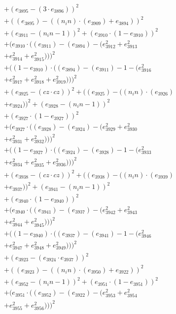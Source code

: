 \documentclass[10pt, a4paper]{article}
\begin{document}
\begin{align*}
& + (e_{3895} - (3  \cdot  e_{3896}))^{2} \\
& + ((e_{3895}) - ((n_in)  \cdot  (e_{3909}) + e_{3894}))^{2} \\
& + (e_{3911} - (n_in - 1))^{2} + (e_{3910}  \cdot  (1 - e_{3910}))^{2} \\
& + (e_{3910}  \cdot  ((e_{3911}) - (e_{3894}) - (e_{3912}^{2} + e_{3913}^{2} \\
& + e_{3914}^{2} + e_{3915}^{2})))^{2} \\
& + ((1 - e_{3910})  \cdot  ((e_{3894}) - (e_{3911}) - 1 - (e_{3916}^{2} \\
& + e_{3917}^{2} + e_{3918}^{2} + e_{3919}^{2})))^{2} \\
& + (e_{3925} - (cz  \cdot  cz))^{2} + ((e_{3925}) - ((n_in)  \cdot  (e_{3926}) \\
& + e_{3924}))^{2} + (e_{3928} - (n_in - 1))^{2} \\
& + (e_{3927}  \cdot  (1 - e_{3927}))^{2} \\
& + (e_{3927}  \cdot  ((e_{3928}) - (e_{3924}) - (e_{3929}^{2} + e_{3930}^{2} \\
& + e_{3931}^{2} + e_{3932}^{2})))^{2} \\
& + ((1 - e_{3927})  \cdot  ((e_{3924}) - (e_{3928}) - 1 - (e_{3933}^{2} \\
& + e_{3934}^{2} + e_{3935}^{2} + e_{3936}^{2})))^{2} \\
& + (e_{3938} - (cz  \cdot  cz))^{2} + ((e_{3938}) - ((n_in)  \cdot  (e_{3939}) \\
& + e_{3937}))^{2} + (e_{3941} - (n_in - 1))^{2} \\
& + (e_{3940}  \cdot  (1 - e_{3940}))^{2} \\
& + (e_{3940}  \cdot  ((e_{3941}) - (e_{3937}) - (e_{3942}^{2} + e_{3943}^{2} \\
& + e_{3944}^{2} + e_{3945}^{2})))^{2} \\
& + ((1 - e_{3940})  \cdot  ((e_{3937}) - (e_{3941}) - 1 - (e_{3946}^{2} \\
& + e_{3947}^{2} + e_{3948}^{2} + e_{3949}^{2})))^{2} \\
& + (e_{3923} - (e_{3924}  \cdot  e_{3937}))^{2} \\
& + ((e_{3923}) - ((n_in)  \cdot  (e_{3950}) + e_{3922}))^{2} \\
& + (e_{3952} - (n_in - 1))^{2} + (e_{3951}  \cdot  (1 - e_{3951}))^{2} \\
& + (e_{3951}  \cdot  ((e_{3952}) - (e_{3922}) - (e_{3953}^{2} + e_{3954}^{2} \\
& + e_{3955}^{2} + e_{3956}^{2})))^{2} \\

\end{align*}
\end{document}
